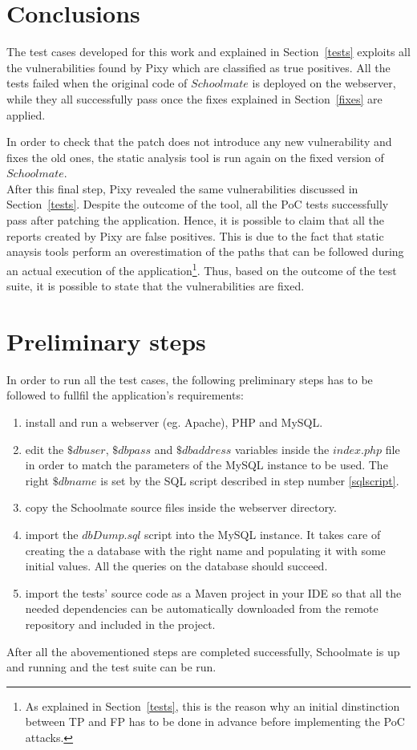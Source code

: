 \documentclass{sig-alternate-05-2015}
\begin{document}
\section{Conclusions}\label{outcomes}
The test cases developed for this work and explained in Section~\ref{tests} exploits all the
vulnerabilities found by Pixy which are classified as true positives. All the tests failed when
the original code of $Schoolmate$ is deployed on the webserver, while they all successfully pass
once the fixes explained in Section~\ref{fixes} are applied.

In order to check that the patch does not introduce any new vulnerability and fixes the old ones,
the static analysis tool is run again on the fixed version of $Schoolmate$.\\
After this final step, Pixy revealed the same vulnerabilities discussed in Section~\ref{tests}.
Despite the outcome of the tool, all the PoC tests successfully pass after patching the application.
Hence, it is possible to claim that all the reports created by Pixy are false positives.
This is due to the fact that static anaysis
tools perform an overestimation of the paths that can be followed during an actual execution
of the application\footnote{As explained in Section~\ref{tests}, this is the reason why an initial
dinstinction between TP and FP has to be done in advance before implementing the PoC attacks.}.
Thus, based on the outcome of the test suite, it is possible to state that the vulnerabilities are
fixed.


\section{Preliminary steps}\label{steps}
In order to run all the test cases, the following preliminary steps has to be followed
to fullfil the application's requirements:
\begin{enumerate}
    \item install and run a webserver (eg. Apache), PHP and MySQL.
    \item edit the $\$dbuser$, $\$dbpass$ and $\$dbaddress$ variables inside the $index.php$ file in
        order to match the parameters of the MySQL instance to be used. The right $\$dbname$ is set
        by the SQL script described in step number \ref{sqlscript}.
    \item copy the Schoolmate source files inside the webserver directory.
    \item \label{sqlscript} import the $dbDump.sql$ script into the MySQL instance. It takes care of
        creating the a database with the right name and populating it with some initial values.
        All the queries on the database should succeed.
    \item import the tests' source code as a Maven project in your IDE so that all the
        needed dependencies can be automatically downloaded from the remote repository
        and included in the project.
\end{enumerate}
After all the abovementioned steps are completed successfully, Schoolmate is up and running
and the test suite can be run.
\end{document}
